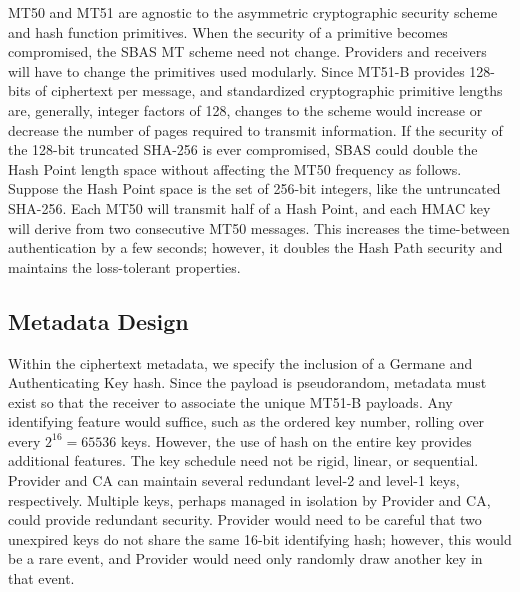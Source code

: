 \documentclass[letterpaper,times]{IONconf/IONconf}
\begin{document}
	MT50 and MT51 are agnostic to the asymmetric cryptographic security scheme and hash function primitives.
	When the security of a primitive becomes compromised, the SBAS MT scheme need not change.
	Providers and receivers will have to change the primitives used modularly.
	Since MT51-B provides 128-bits of ciphertext per message, and standardized cryptographic primitive lengths are, generally, integer factors of 128, changes to the scheme would increase or decrease the number of pages required to transmit information.
	If the security of the 128-bit truncated SHA-256 is ever compromised, SBAS could double the Hash Point length space without affecting the MT50 frequency as follows.
	Suppose the Hash Point space is the set of 256-bit integers, like the untruncated SHA-256.
	Each MT50 will transmit half of a Hash Point, and each HMAC key will derive from two consecutive MT50 messages.
	This increases the time-between authentication by a few seconds; however, it doubles the Hash Path security and maintains the loss-tolerant properties.

	\subsection{Metadata Design} \label{sub:metadata_design}

		Within the ciphertext metadata, we specify the inclusion of a Germane and Authenticating Key hash.
		Since the payload is pseudorandom, metadata must exist so that the receiver to associate the unique MT51-B payloads.
		Any identifying feature would suffice, such as the ordered key number, rolling over every $2^{16} = 65536$ keys.
		However, the use of hash on the entire key provides additional features.
		The key schedule need not be rigid, linear, or sequential.
		Provider and CA can maintain several redundant level-2 and level-1 keys, respectively.
		Multiple keys, perhaps managed in isolation by Provider and CA, could provide redundant security.
		Provider would need to be careful that two unexpired keys do not share the same 16-bit identifying hash; however, this would be a rare event, and Provider would need only randomly draw another key in that event.
\end{document}
